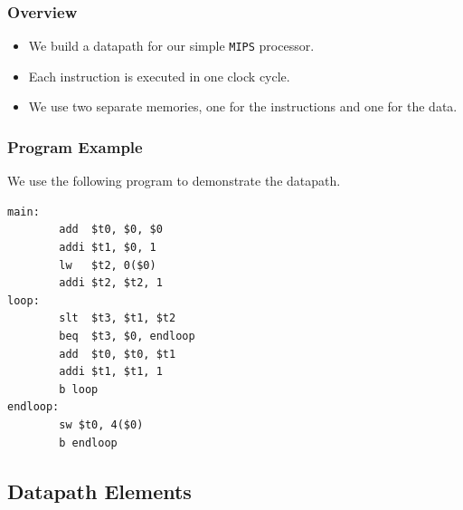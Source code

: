 \documentclass{beamer}
\newcounter{exo}
\newcommand{\exo}{
  \addtocounter{exo}{1}
  Exercice \arabic{exo}
}
\begin{document}
\begin{frame}%
\frametitle{Overview}

\begin{itemize}

\item We build a datapath for our simple \texttt{MIPS} processor.

\vspace{0.5cm}

\item Each instruction is executed in one clock cycle.

\vspace{0.5cm}

\item We use two separate memories, one for the instructions and one for the data.

\end{itemize}

\end{frame}

\begin{frame}[fragile]
\frametitle{Program Example}

We use the following program to demonstrate the datapath.

\vspace{0.5cm}

\scriptsize
\begin{lstlisting}
main:
        add  $t0, $0, $0
        addi $t1, $0, 1
        lw   $t2, 0($0)
        addi $t2, $t2, 1
loop:
        slt  $t3, $t1, $t2
        beq  $t3, $0, endloop
        add  $t0, $t0, $t1
        addi $t1, $t1, 1
        b loop
endloop:
        sw $t0, 4($0)
        b endloop
\end{lstlisting}

\end{frame}


\subsection{Datapath Elements}
\end{document}
